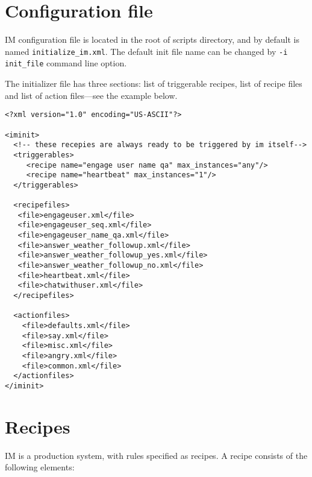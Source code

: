 \section{Configuration file}

IM configuration file is located in the root of scripts directory, and by default is named \texttt{initialize\_im.xml}. The default init file name can be changed by \texttt{-i init\_file} command line option.

The initializer file has three sections: list of triggerable recipes, list of recipe files and list of action files---see the example below.

\lstset{language=XML}
\begin{lstlisting}
<?xml version="1.0" encoding="US-ASCII"?>
 
<iminit>
  <!-- these recepies are always ready to be triggered by im itself-->
  <triggerables>
     <recipe name="engage user name qa" max_instances="any"/>
     <recipe name="heartbeat" max_instances="1"/>
  </triggerables>
 
  <recipefiles>             
   <file>engageuser.xml</file>
   <file>engageuser_seq.xml</file>
   <file>engageuser_name_qa.xml</file>
   <file>answer_weather_followup.xml</file>
   <file>answer_weather_followup_yes.xml</file>
   <file>answer_weather_followup_no.xml</file>
   <file>heartbeat.xml</file>   
   <file>chatwithuser.xml</file>
  </recipefiles>

  <actionfiles>
    <file>defaults.xml</file>
    <file>say.xml</file>
    <file>misc.xml</file>
    <file>angry.xml</file>
    <file>common.xml</file>
  </actionfiles>
</iminit>
\end{lstlisting}

\section{Recipes}

IM is a production system, with rules specified as recipes. A recipe consists of the following elements:

